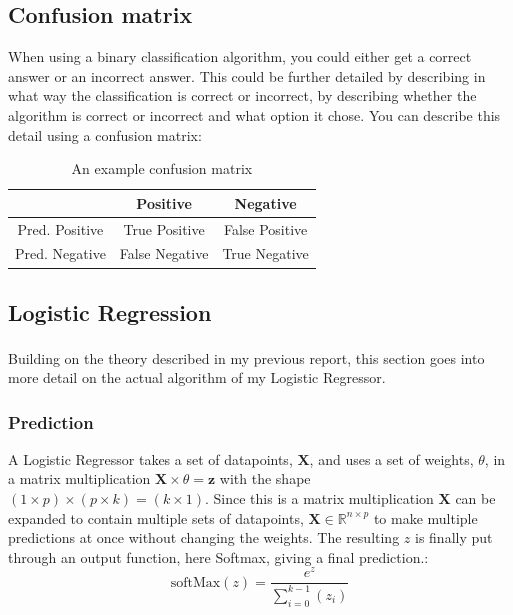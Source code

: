\documentclass[a4paper, UKenglish]{article}
\newcommand{\0}{\mathbf{0}}
\newcommand{\1}{\mathbf{1}}
\newcommand{\citesup}[1]{\textsuperscript{\cite{#1}}}
\begin{document}
\subsection{Confusion matrix}
When using a binary classification algorithm, you could either get a correct answer or an incorrect answer. This could be further detailed by describing in what way the classification is correct or incorrect, by describing whether the algorithm is correct or incorrect and what option it chose. You can describe this detail using a confusion matrix:

\begin{table}[H]
\centering
\caption{An example confusion matrix}
\label{tab:confusion matrix}
\begin{tabular}{|c||c|c|}
    \hline
           & Positive   & Negative   \\
\hline
\hline
    Pred. Positive & True Positive  & False Positive \\
    \hline
    Pred. Negative & False Negative & True Negative  \\
    \hline
\end{tabular}
\end{table}



\subsection{Logistic Regression}
Building on the theory described in my previous report\citesup{project_2}, this section goes into more detail on the actual algorithm of my Logistic Regressor.

\subsubsection{Prediction}
A Logistic Regressor takes a set of datapoints, $\textbf{X}$, and uses a set of weights, $\theta$, in a matrix multiplication $\mathbf{X} \times \theta = \textbf{z}$ with the shape $\left(1\times p\right) \times \left(p\times k\right) = \left(k\times1\right)$. Since this is a matrix multiplication $\mathbf{X}$ can be expanded to contain multiple sets of datapoints, $\mathbf{X} \in  \mathbb{R}^{n\times p}$ to make multiple predictions at once without changing the weights. The resulting $z$ is finally put through an output function, here Softmax, giving a final prediction.: $$\text{softMax}(z) = \frac{e^z}{\sum\limits_{i=0}^{k-1}\left(z_i\right)}$$
\end{document}
